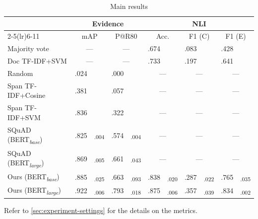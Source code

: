 \begin{table}[t]
    \centering
    \begin{threeparttable}
        \centering
        \fontsize{8pt}{10pt}\selectfont
        \setlength{\tabcolsep}{2pt}
        \renewcommand{\arraystretch}{.6}
        \begin{tabular}{lc@{\hskip0pt}cc@{\hskip0pt}cc@{\hskip0pt}cc@{\hskip0pt}cc@{\hskip0pt}c}\toprule
            & \multicolumn{4}{c}{Evidence} & \multicolumn{6}{c}{NLI} \\\cmidrule(lr){2-5}\cmidrule(lr){6-11}
            & \multicolumn{2}{c}{mAP} & \multicolumn{2}{c}{P@R80} & \multicolumn{2}{c}{Acc.} & \multicolumn{2}{c}{F1 (C)} & \multicolumn{2}{c}{F1 (E)} \\\midrule
            Majority vote & \multicolumn{2}{c}{---} & \multicolumn{2}{c}{---} & .674 &  & .083 &  & .428 & \\
            Doc TF-IDF+SVM & \multicolumn{2}{c}{---} & \multicolumn{2}{c}{---} & .733 &  & .197 &  & .641 & \\
            Random & .024 & & .000 &  & \multicolumn{2}{c}{---} & \multicolumn{2}{c}{---} & \multicolumn{2}{c}{---} \\
            Span TF-IDF+Cosine & .381 & & .057  &  & \multicolumn{2}{c}{---} & \multicolumn{2}{c}{---} & \multicolumn{2}{c}{---} \\
            Span TF-IDF+SVM & .836 & & .322 &  & \multicolumn{2}{c}{---} & \multicolumn{2}{c}{---} & \multicolumn{2}{c}{---} \\
            SQuAD (BERT\textsubscript{\textit{base}}) & .825 & \textsubscript{.004} & .574 & \textsubscript{.004} & \multicolumn{2}{c}{---} & \multicolumn{2}{c}{---} & \multicolumn{2}{c}{---} \\
            SQuAD (BERT\textsubscript{\textit{large}}) & .869 & \textsubscript{.005} & .661 & \textsubscript{.043} & \multicolumn{2}{c}{---} & \multicolumn{2}{c}{---} & \multicolumn{2}{c}{---} \\
            \midrule
            Ours (BERT\textsubscript{\textit{base}})  & .885 & \textsubscript{.025} & .663 & \textsubscript{.093} & .838 & \textsubscript{.020} & .287 & \textsubscript{.022} & .765 & \textsubscript{.035} \\
            Ours (BERT\textsubscript{\textit{large}}) & .922 & \textsubscript{.006} & .793 & \textsubscript{.018} & .875 & \textsubscript{.006} & .357 & \textsubscript{.039} & .834 & \textsubscript{.002} \\
            \bottomrule
        \end{tabular}
        \makeatletter\def\TPT@hsize{}\makeatletter
        \begin{tablenotes}
            \raggedright
            \fontsize{7pt}{7pt}\selectfont
            Refer to \cref{sec:experiment-settings} for the details on the metrics.
        \end{tablenotes}
    \end{threeparttable}
    \caption{Main results}\label{tab:results}
\end{table}
